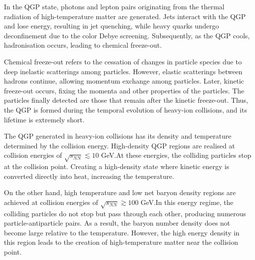         In the QGP state, photons and lepton pairs originating from the thermal radiation of high-temperature matter are generated. Jets interact with the QGP and lose energy, resulting in jet quenching, while heavy quarks undergo deconfinement due to the color Debye screening. Subsequently, as the QGP cools, hadronisation occurs, leading to chemical freeze-out.  
               
        Chemical freeze-out refers to the cessation of changes in particle species due to deep inelastic scatterings among particles. However, elastic scatterings between hadrons continue, allowing momentum exchange among particles. Later, kinetic freeze-out occurs, fixing the momenta and other properties of the particles. The particles finally detected are those that remain after the kinetic freeze-out. Thus, the QGP is formed during the temporal evolution of heavy-ion collisions, and its lifetime is extremely short.
        
        
        The QGP generated in heavy-ion collisions has its density and temperature determined by the collision energy. High-density QGP regions are realised at collision energies of $\sqrt{s_{NN}} \lesssim 10$ GeV.\@ At these energies, the colliding particles stop at the collision point. Creating a high-density state where kinetic energy is converted directly into heat, increasing the temperature.  
  
        On the other hand, high temperature and low net baryon density regions are achieved at collision energies of $\sqrt{s_{NN}} \gtrsim 100$ GeV.\@ In this energy regime, the colliding particles do not stop but pass through each other, producing numerous particle-antiparticle pairs. As a result, the baryon number density does not become large relative to the temperature. However, the high energy density in this region leads to the creation of high-temperature matter near the collision point.  
               

